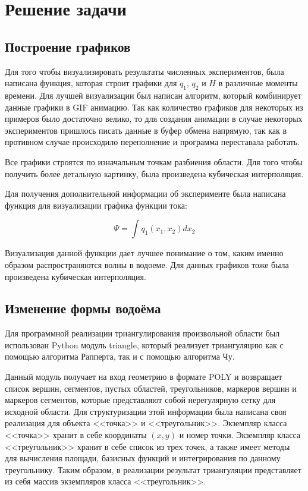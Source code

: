 \documentclass[14pt]{extreport}
\begin{document}
\chapter{Решение задачи}

\section{Построение графиков}

Для того чтобы визуализировать результаты численных экспериментов, была написана функция, которая строит графики для $q_1$, $q_2$ и $H$ в различные моменты времени. Для лучшей визуализации был написан алгоритм, который комбинирует данные графики в GIF анимацию. Так как количество графиков для некоторых из примеров было достаточно велико, то для создания анимации в случае некоторых экспериментов пришлось писать данные в буфер обмена напрямую, так как в противном случае происходило переполнение и программа переставала работать.

Все графики строятся по изначальным точкам разбиения области. Для того чтобы получить более детальную картинку, была произведена кубическая интерполяция.

Для получения дополнительной информации об эксперименте была написана функция для визуализации графика функции тока:

$$\Psi = \int q_1(x_1, x_2) dx_2$$

Визуализация данной функции дает лучшее понимание о том, каким именно образом распространяются волны в водоеме. Для данных графиков тоже была произведена кубическая интерполяция.

\section{Изменение формы водоёма}

Для программной реализации триангулирования произвольной области был использован Python модуль triangle\cite{bib:website:quake:triangle}, который реализует триангуляцию как с помощью алгоритма Рапперта, так и с помощью алгоритма Чу.

Данный модуль получает на вход геометрию в формате POLY и возвращает список вершин, сегментов, пустых областей, треугольников, маркеров вершин и маркеров сегментов, которые представляют собой нерегулярную сетку для исходной области. Для структуризации этой информации была написана своя реализация для объекта <<точка>> и <<треугольник>>. Экземпляр класса <<точка>> хранит в себе координаты $(x, y)$ и номер точки. Экземпляр класса <<треугольник>> хранит в себе список из трех точек, а также имеет методы для вычисления площади, базисных функций и интегрирования по данному треугольнику. Таким образом, в реализации результат триангуляции представляет из себя массив экземпляров класса <<треугольник>>.
\end{document}

